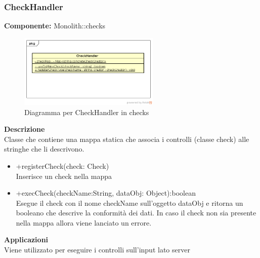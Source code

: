 \subsubsection{CheckHandler}
\textbf{Componente:}  Monolith::checks\\
   \FloatBarrier
   \begin{figure}[ht]
   \centering
   \includegraphics[width=0.6\textwidth]{img/single-CheckHandler.png}
   \caption{{Diagramma per CheckHandler in checks}}
\end{figure}
\FloatBarrier
\textbf{Descrizione}\\
Classe che contiene una mappa statica che associa i controlli (classe check) alle stringhe che li descrivono. 
\begin{itemize}
\item +registerCheck(check: Check) \\
Inserisce un check nella mappa
\item +execCheck(checkName:String, dataObj: Object):boolean \\
Esegue il check con il nome checkName sull'oggetto dataObj e ritorna un booleano che descrive la conformità dei dati. In caso il check non sia presente nella mappa allora viene lanciato un errore.
\end{itemize} 


\textbf{Applicazioni}\\
Viene utilizzato per eseguire i controlli sull'input lato server 


\clearpage

